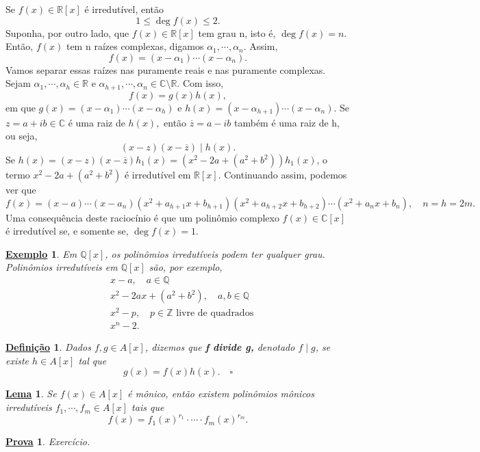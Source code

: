 \documentclass{article}
\newtheorem*{def*}{\underline{Defini\c c\~ao}}
\newtheorem*{lemma*}{\underline{Lema}}
\newtheorem{example}{\underline{Exemplo}}
\newtheorem*{proof*}{\underline{Prova}}
\begin{document}
   Se \(f(x)\in \mathbb{R}[x]\) é irredutível, então 
  \[
    1\leq \deg{f(x)}\leq 2.
  \]
  Suponha, por outro lado, que \(f(x)\in \mathbb{R}[x]\) tem grau n, isto é, \(\deg{f(x)} = n.\) Então, \(f(x)\) tem n raízes complexas,
digamos \(\alpha_{1}, \cdots, \alpha_{n}\). Assim, 
  \[
    f(x) = (x-\alpha_{1})\cdots(x-\alpha_{n}).
  \]
  Vamos separar essas raízes nas puramente reais e nas puramente complexas. Sejam \(\alpha_{1}, \cdots, \alpha_{h}\in \mathbb{R}\) e
 \(\alpha_{h+1}, \cdots, \alpha_{n}\in \mathbb{C}\setminus{\mathbb{R}}.\) Com isso, 
  \[
    f(x) = g(x)h(x),
  \]
em que \(g(x) = (x-\alpha_{1})\cdots(x-\alpha_{h})\) e \(h(x) = (x-\alpha_{h+1})\cdots(x-\alpha_{n}).\)
Se \(z = a + ib\in \mathbb{C}\) é uma raiz de \(h(x),\) então \(\overline{z} = a - ib\) também é uma raiz de h, ou seja, 
  \[
    (x-z)(x-\overline{z})\mid h(x).
  \]
  Se \(h(x) = (x-z)(x-\overline{z})h_{1}(x) = (x^{2}-2a + (a^{2}+b^{2}))h_{1}(x)\), o termo 
  \(x^{2}-2a + (a^{2}+b^{2})\) é irredutível em \(\mathbb{R}[x]\). Continuando assim, podemos ver que 
  \[
    f(x) = (x-a)\cdots(x-a_{n})(x^{2}+a_{h+1}x + b_{h+1})(x^{2}+a_{h+2}x+b_{h+2})\cdots(x^{2}+a_{n}x + b_{n}),\quad n = h = 2m.
  \]
  Uma consequência deste raciocínio é que um polinômio complexo \(f(x)\in \mathbb{C}[x]\) é irredutível se, e somente se, \(\deg{f(x)} = 1.\)
 \begin{example}
   Em \(\mathbb{Q}[x]\), os polinômios irredutíveis podem ter qualquer grau. Polinômios irredutíveis em \(\mathbb{Q}[x]\)
são, por exemplo, 
\begin{align*}
  &x-a,\quad a\in \mathbb{Q}\\
  &x^{2}-2ax + (a^{2}+b^{2}),\quad a, b\in \mathbb{Q}\\
  &x^{2} - p,\quad p\in \mathbb{Z}\text{ livre de quadrados}\\
  &x^{n} - 2.
\end{align*}
 \end{example}
\begin{def*}
  Dados \(f, g\in A[x]\), dizemos que \textbf{f divide g,} denotado \(f\mid g\), se existe \(h\in A[x]\) tal que 
    \[
      g(x) = f(x)h(x).\quad\square
    \]
\end{def*}
\begin{lemma*}
  Se \(f(x)\in A[x]\) é mônico, então existem polinômios mônicos irredutíveis \(f_{1}, \cdots, f_{m}\in A[x]\) tais que 
    \[
      f(x) = f_{1}(x)^{r_{1}}\cdot \cdots \cdot f_{m}(x)^{r_{m}}.
    \]
\end{lemma*}
\begin{proof*}
  Exercício.
\end{proof*}
\end{document}
